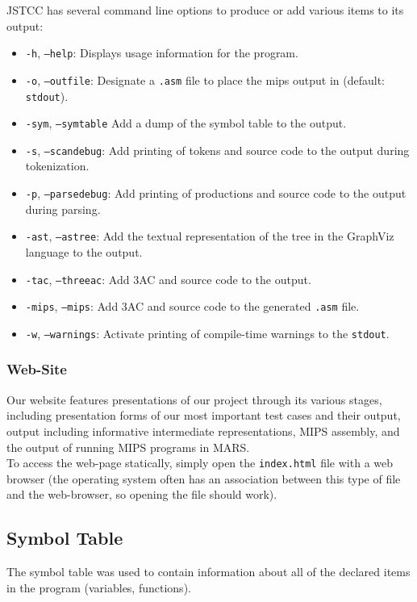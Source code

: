 \documentclass{article}
\begin{document}
\noindent JSTCC has several command line options to produce or add various items to its
output:
  \begin{itemize}
  \item \texttt{-h}, \texttt{--help}: Displays usage information for the
        program.
  \item \texttt{-o}, \texttt{--outfile}: Designate a \texttt{.asm} file to place
        the mips output in (default: \texttt{stdout}).
  \item \texttt{-sym}, \texttt{--symtable} Add a dump of the symbol table to the
        output.
  \item \texttt{-s}, \texttt{--scandebug}: Add printing of tokens and source
        code to the output during tokenization.
  \item \texttt{-p}, \texttt{--parsedebug}: Add printing of productions and
        source code to the output during parsing.
  \item \texttt{-ast}, \texttt{--astree}: Add the textual representation of the
        tree in the GraphViz language to the output.
  \item \texttt{-tac}, \texttt{--threeac}: Add 3AC and source code to the
        output.
  \item \texttt{-mips}, \texttt{--mips}: Add 3AC and source code to the
        generated \texttt{.asm} file.
  \item \texttt{-w}, \texttt{--warnings}: Activate printing of compile-time
        warnings to the \texttt{stdout}.
  \end{itemize}

\subsubsection{Web-Site}
\noindent Our website features presentations of our project through its various stages,
including presentation forms of our most important test cases and their output,
output including informative intermediate representations, MIPS assembly, and
the output of running MIPS programs in MARS.\\

\noindent To access the web-page statically, simply open the \texttt{index.html} file with
a web browser (the operating system often has an association between this type
of file and the web-browser, so opening the file should work).


\subsection{Symbol Table}
\noindent The symbol table was used to contain information about all of the declared items
in the program (variables, functions).\\
\end{document}

